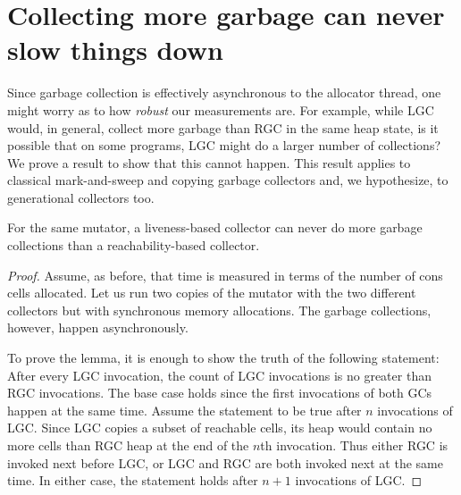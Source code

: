 \documentclass{llncs}
\begin{document}
\section{Collecting more garbage can never slow things down}
\label{sec:lgc-always-better}
Since garbage collection is  effectively asynchronous to the allocator
thread, one might  worry as to how {\em  robust} our measurements are.
For example,  while LGC would,  in general, collect more  garbage than
RGC in the same heap state,  is it possible that on some programs, LGC
might do  a larger number  of collections? We  prove a result  to show
that   this  cannot   happen.    This  result   applies  to   classical
mark-and-sweep and copying garbage  collectors and, we hypothesize, to
generational collectors too.

\begin{lemma}
For the  same mutator,  a liveness-based collector  can never  do more
garbage collections than a reachability-based collector.
\end{lemma}
 
\begin{proof}Assume, as before,  that time is measured in terms of the number of
  cons cells allocated. Let us run  two copies of the mutator with the
  two    different   collectors    but    with   synchronous    memory
  allocations.   The   garbage    collections,   however,   happen
  asynchronously.

  To prove the lemma, it is enough to show the truth of the following 
statement: After
 every  LGC invocation,  the count of LGC invocations   is  no greater
than  RGC invocations.   The  base case  holds  since the  first
invocations of both GCs happen at the same time.  Assume the statement
to be true after $n$ invocations of LGC.  Since LGC copies a subset of
reachable cells, its heap would contain no more cells than RGC heap at
the end  of the $n$th invocation.   Thus either RGC  is invoked next before
LGC, or LGC and RGC are both invoked next at the same time.  In either
case, the statement holds after $n+1$ invocations of LGC.
\end{proof}



\end{document}
